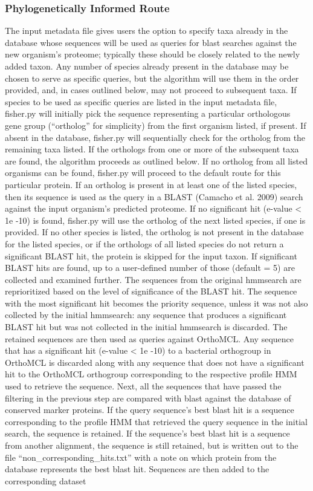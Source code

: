 \documentclass{article}
\begin{document}
            \subsubsection{Phylogenetically Informed Route}
                The input metadata file gives users the option to specify taxa already in the database whose sequences will be used as queries for blast searches against the new organism’s proteome; typically these should be closely related to the newly added taxon. Any number of species already present in the database may be chosen to serve as specific queries, but the algorithm will use them in the order provided, and, in cases outlined below, may not proceed to subsequent taxa. If species to be used as specific queries are listed in the input metadata file, fisher.py will initially pick the sequence representing a particular orthologous gene group (“ortholog” for simplicity) from the first organism listed, if present. If absent in the database, fisher.py will sequentially check for the ortholog from the remaining taxa listed. If the orthologs from one or more of the subsequent taxa are found, the algorithm proceeds as outlined below. If no ortholog from all listed organisms can be found, fisher.py will proceed to the default route for this particular protein. If an ortholog is present in at least one of the listed species, then its sequence is used as the query in a BLAST (Camacho et al. 2009) search against the input organism’s predicted proteome. If no significant hit (e-value < 1e -10) is found, fisher.py will use the ortholog of the next listed species, if one is provided. If no other species is listed, the ortholog is not present in the database for the listed species, or if the orthologs of all listed species do not return a significant BLAST hit, the protein is skipped for the input taxon. If significant BLAST hits are found, up to a user-defined number of those (default = 5) are collected and examined further. The sequences from the original hmmsearch are reprioritized based on the level of significance of the BLAST hit. The sequence with the most significant hit becomes the priority sequence, unless it was not also collected by the initial hmmsearch: any sequence that produces a significant BLAST hit but was not collected in the initial hmmsearch is discarded. The retained sequences are then used as queries against OrthoMCL. Any sequence that has a significant hit (e-value < 1e -10) to a bacterial orthogroup in OrthoMCL is discarded along with any sequence that does not have a significant hit to the OrthoMCL orthogroup corresponding to the respective profile HMM used to retrieve the sequence. Next, all the sequences that have passed the filtering in the previous step are compared with blast against the database of conserved marker proteins. If the query sequence’s best blast hit is a sequence corresponding to the profile HMM that retrieved the query sequence in the initial search, the sequence is retained. If the sequence’s best blast hit is a sequence from another alignment, the sequence is still retained, but is written out to the file “non\_corresponding\_hits.txt” with a note on which protein from the database represents the best blast hit. Sequences are then added to the corresponding dataset 
\end{document}
